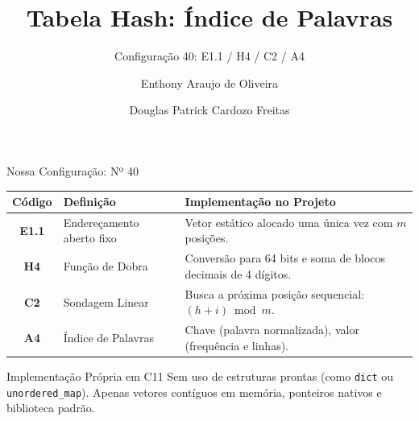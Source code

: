 \documentclass[aspectratio=169,11pt]{beamer}
\title[Tabela Hash -- Configuração 40]{Tabela Hash: Índice de Palavras}
\subtitle{Configuração 40: E1.1 / H4 / C2 / A4}
\author{Enthony Araujo de Oliveira \and Douglas Patrick Cardozo Freitas}
\institute{Estrutura de Dados II \\ Professor: Kennedy Lopes}
\date{}
\begin{document}
\begin{frame}
  \titlepage
\end{frame}

\begin{frame}{Nossa Configuração: Nº 40}
  \small
  \renewcommand{\arraystretch}{1.15}
  \begin{table}
    \centering
    \begin{tabular}{@{}clp{8.2cm}@{}}
      \toprule
      \textbf{Código} & \textbf{Definição} & \textbf{Implementação no Projeto} \\
      \midrule
      \textbf{E1.1} & Endereçamento aberto fixo & Vetor estático alocado uma única vez com $m$ posições. \\
      \textbf{H4}   & Função de Dobra & Conversão para 64 bits e soma de blocos decimais de 4 dígitos. \\
      \textbf{C2}   & Sondagem Linear & Busca a próxima posição sequencial: $(h + i) \bmod m$. \\
      \textbf{A4}   & Índice de Palavras & Chave (palavra normalizada), valor (frequência e linhas). \\
      \bottomrule
    \end{tabular}
  \end{table}

  \normalsize
  \vspace{-0.5em}
  \begin{block}{Implementação Própria em C11}
    Sem uso de estruturas prontas (como \texttt{dict} ou \texttt{unordered\_map}). Apenas vetores contíguos em memória, ponteiros nativos e biblioteca padrão.
  \end{block}
\end{frame}
\end{document}
